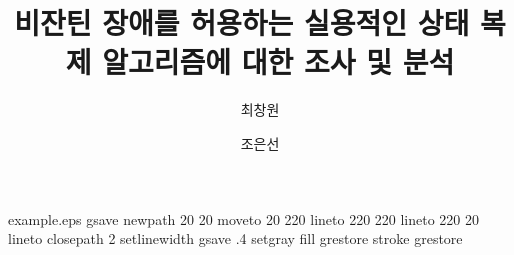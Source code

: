 %
%
%
%
%
\begin{filecontents*}{example.eps}
gsave
newpath
  20 20 moveto
  20 220 lineto
  220 220 lineto
  220 20 lineto
closepath
2 setlinewidth
gsave
  .4 setgray fill
grestore
stroke
grestore
\end{filecontents*}
%
\RequirePackage{fix-cm}
%
\documentclass[smallextended]{svjour3}       %
%
\usepackage{kotex}                           %

\smartqed  %
%
\usepackage{graphicx}
%
%
%
%
%


\title{비잔틴 장애를 허용하는 실용적인 상태 복제 알고리즘에 대한 조사 및 분석%
}


\author{최창원         \and
        조은선 %
}


